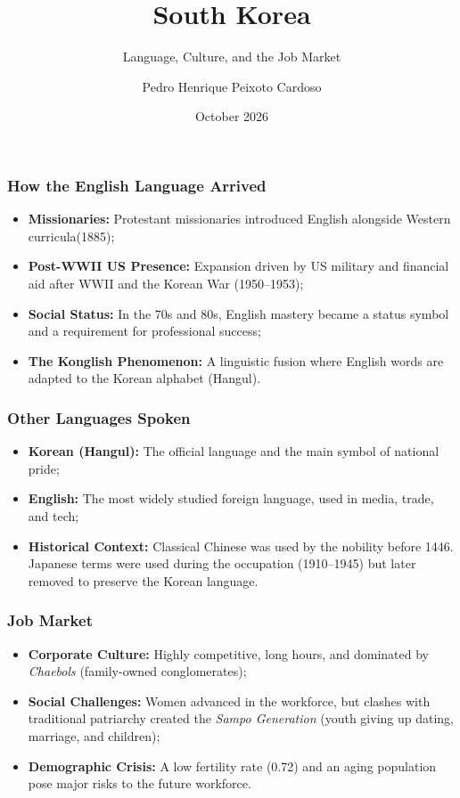 \documentclass{beamer}
\title{South Korea}
\subtitle{Language, Culture, and the Job Market}
\author{Pedro Henrique Peixoto Cardoso}
\date{October 2026}
\begin{document}
\begin{frame}
    \titlepage
\end{frame}

\begin{frame}
    \frametitle{How the English Language Arrived}
    \begin{itemize}
        \item \textbf{Missionaries:} Protestant missionaries introduced English alongside Western curricula(1885);
        \item \textbf{Post-WWII US Presence:} Expansion driven by US military and financial aid after WWII and the Korean War (1950–1953);
        \item \textbf{Social Status:} In the 70s and 80s, English mastery became a status symbol and a requirement for professional success;
        \item \textbf{The Konglish Phenomenon:} A linguistic fusion where English words are adapted to the Korean alphabet (Hangul).
    \end{itemize}
\end{frame}

\begin{frame}
    \frametitle{Other Languages Spoken}
    \begin{itemize}
        \item \textbf{Korean (Hangul):} The official language and the main symbol of national pride;
        \item \textbf{English:} The most widely studied foreign language, used in media, trade, and tech;
        \item \textbf{Historical Context:} Classical Chinese was used by the nobility before 1446. Japanese terms were used during the occupation (1910–1945) but later removed to preserve the Korean language.
    \end{itemize}
\end{frame}

\begin{frame}
    \frametitle{Job Market}
    \begin{itemize}
        \item \textbf{Corporate Culture:} Highly competitive, long hours, and dominated by \textit{Chaebols} (family-owned conglomerates);
        \item \textbf{Social Challenges:} Women advanced in the workforce, but clashes with traditional patriarchy created the \textit{Sampo Generation} (youth giving up dating, marriage, and children);
        \item \textbf{Demographic Crisis:} A low fertility rate (0.72) and an aging population pose major risks to the future workforce.
    \end{itemize}
\end{frame}
\end{document}
